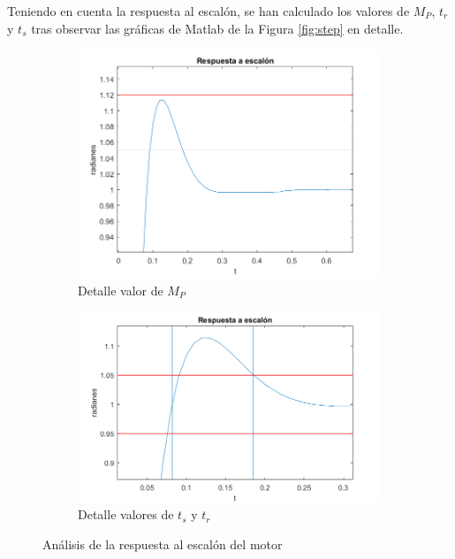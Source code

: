 \documentclass[a4paper]{article}
\begin{document}
Teniendo en cuenta la respuesta al escalón, se han calculado los valores de $M_P$, $t_r$ y $t_s$ tras observar las gráficas de Matlab de la Figura \ref{fig:step} en detalle.

\begin{figure}[htp]
	\begin{center}
		\begin{subfigure}[b]{0.45\textwidth}
			\centering
			\includegraphics[width=\textwidth]{escalon_Mp2}
			\caption{Detalle valor de $M_P$}
			\label{mp2}
		\end{subfigure}
		\begin{subfigure}[b]{0.45\textwidth}
			\centering
			\includegraphics[width=\textwidth]{escalon_ts_tr2}
			\caption{Detalle valores de $t_s$ y $t_r$}
			\label{fig:tr}
		\end{subfigure}
	\end{center}
		\caption{Análisis de la respuesta al escalón del motor}
		\label{fig:escalon}
	\end{figure}
\end{document}
